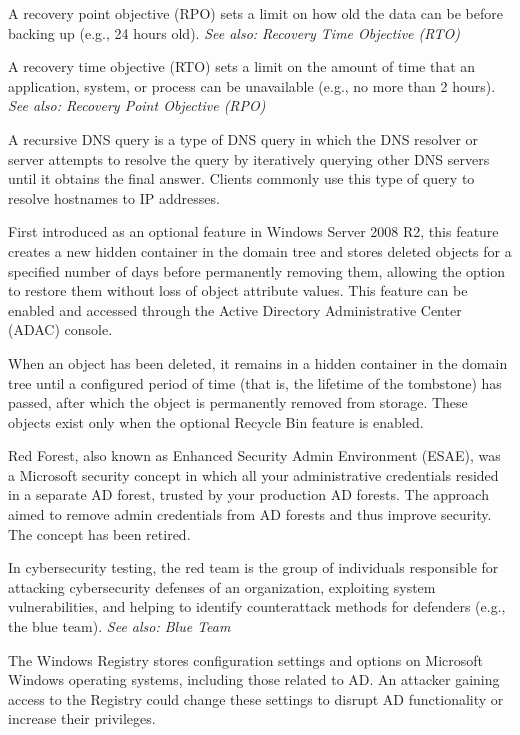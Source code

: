  A recovery point objective (RPO) sets a limit on how old the data can be before backing up (e.g., 24 hours old). 
\textit{See also: Recovery Time Objective (RTO)}

 A recovery time objective (RTO) sets a limit on the amount of time that an application, system, or process can be unavailable (e.g., no more than 2 hours).
\textit{See also: Recovery Point Objective (RPO)}

 A recursive DNS query is a type of DNS query in which the DNS resolver or server attempts to resolve the query by iteratively querying other DNS servers until it obtains the final answer. Clients commonly use this type of query to resolve hostnames to IP addresses.

 First introduced as an optional feature in Windows Server 2008 R2, this feature creates a new hidden container in the domain tree and stores deleted objects for a specified number of days before permanently removing them, allowing the option to restore them without loss of object attribute values. This feature can be enabled and accessed through the Active Directory Administrative Center (ADAC) console.

 When an object has been deleted, it remains in a hidden container in the domain tree until a configured period of time (that is, the lifetime of the tombstone) has passed, after which the object is permanently removed from storage. These objects exist only when the optional Recycle Bin feature is enabled.

 Red Forest, also known as Enhanced Security Admin Environment (ESAE), was a Microsoft security concept in which all your administrative credentials resided in a separate AD forest, trusted by your production AD forests. The approach aimed to remove admin credentials from AD forests and thus improve security. The concept has been retired.

 In cybersecurity testing, the red team is the group of individuals responsible for attacking cybersecurity defenses of an organization, exploiting system vulnerabilities, and helping to identify counterattack methods for defenders (e.g., the blue team).
\textit{See also: Blue Team}

 The Windows Registry stores configuration settings and options on Microsoft Windows operating systems, including those related to AD. An attacker gaining access to the Registry could change these settings to disrupt AD functionality or increase their privileges.

